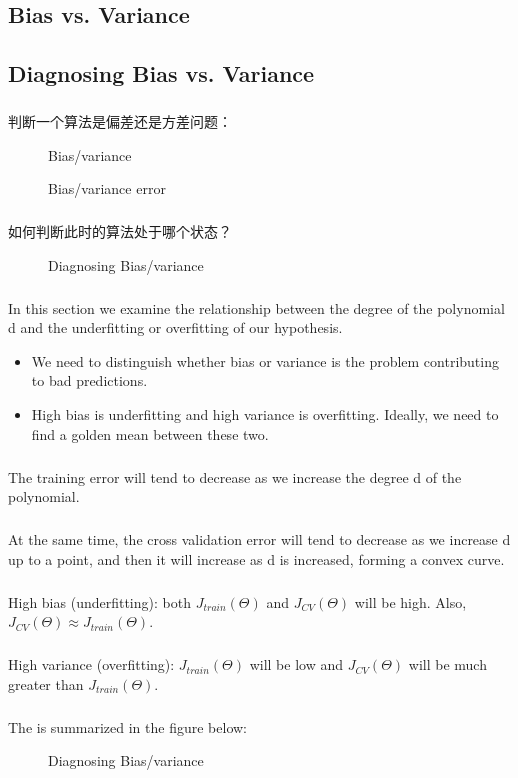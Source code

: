\documentclass{article}
\begin{document}
\begin{CJK}{UTF8}{gbsn}
\section{Bias vs. Variance}
\subsection{Diagnosing Bias vs. Variance}
\subparagraph{}
判断一个算法是偏差还是方差问题：
\begin{figure}[H]
\label{fig:617}
\caption{Bias/variance}
\end{figure}
\begin{figure}[H]
\label{fig:619}
\caption{Bias/variance error}
\end{figure}
\subparagraph{}
如何判断此时的算法处于哪个状态？
\begin{figure}[H]
\label{fig:620}
\caption{Diagnosing Bias/variance}
\end{figure}
\begin{figure}[H]
\label{fig:621}
\end{figure}
\subparagraph{}
In this section we examine the relationship between the degree of the polynomial d and the underfitting or overfitting of our hypothesis.
\begin{itemize}
\item We need to distinguish whether bias or variance is the problem contributing to bad predictions.
\item High bias is underfitting and high variance is overfitting. Ideally, we need to find a golden mean between these two.
\end{itemize}
\subparagraph{}
The training error will tend to decrease as we increase the degree d of the polynomial.
\subparagraph{}
At the same time, the cross validation error will tend to decrease as we increase d up to a point, and then it will increase as d is increased, forming a convex curve.
\subparagraph{}
High bias (underfitting): both $J_{train}(\Theta)$ and $J_{CV}(\Theta)$ will be high. Also, $J_{CV}(\Theta)\approx{J_{train}(\Theta)}$.
\subparagraph{}
High variance (overfitting): $J_{train}(\Theta)$ will be low and $J_{CV}(\Theta)$ will be much greater than $J_{train}(\Theta)$.
\subparagraph{}
The is summarized in the figure below:
\begin{figure}[H]
\label{fig:625}
\caption{Diagnosing Bias/variance}
\end{figure}

\end{CJK}
\end{document}

